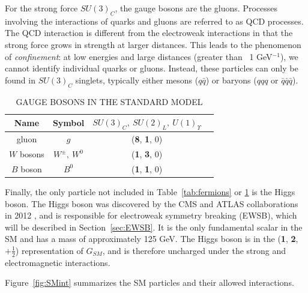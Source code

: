 For the strong force $SU(3)_C$, the gauge bosons are the gluons. Processes involving the interactions of quarks and gluons are referred to as QCD processes. The QCD interaction is different from the electroweak interactions in that the strong force grows in strength at larger distances. This leads to the phenomenon of \textit{confinement}: at low energies and large distances (greater than ~1 GeV$^{-1}$), we cannot identify individual quarks or gluons. Instead, these particles can only be found in $SU(3)_C$ singlets, typically either mesons ($q\bar{q}$) or baryons ($qqq$ or $\bar{q}\bar{q}\bar{q}$). 

\begin{table}[ht]
    \caption{GAUGE BOSONS IN THE STANDARD MODEL}
    \centering
    \begin{tabular}{|c|c|c|c|}
    \hline
    \hline
    Name  & Symbol & $SU(3)_C,~SU(2)_L,~U(1)_\Upsilon $\\
  	  \hline
           \hline    
gluon         & $g$   & (\textbf{8}, \textbf{1}, 0) \\
\hline
$W$ bosons & $W^\pm,~W^0$ & (\textbf{1}, \textbf{3}, 0) \\
\hline
$B$ boson & $B^0$ & (\textbf{1}, \textbf{1}, 0) \\
           \hline
           \hline
    \end{tabular}
    \label{tab:bosons}
\end{table}


Finally, the only particle not included in Table~\ref{tab:fermions} or \ref{tab:bosons} is the Higgs boson. The Higgs boson was discovered by the CMS and ATLAS collaborations in 2012 \cite{ATLASHiggs,CMSHiggs}, and is responsible for electroweak symmetry breaking (EWSB), which will be described in Section~\ref{sec:EWSB}. It is the only fundamental scalar in the SM and has a mass of approximately 125 GeV. The Higgs boson is in the  (\textbf{1}, \textbf{2}, $+\frac{1}{2}$) representation of $G_{SM}$, and is therefore uncharged under the strong and electromagnetic interactions. 

Figure~\ref{fig:SMint} summarizes the SM particles and their allowed interactions.

